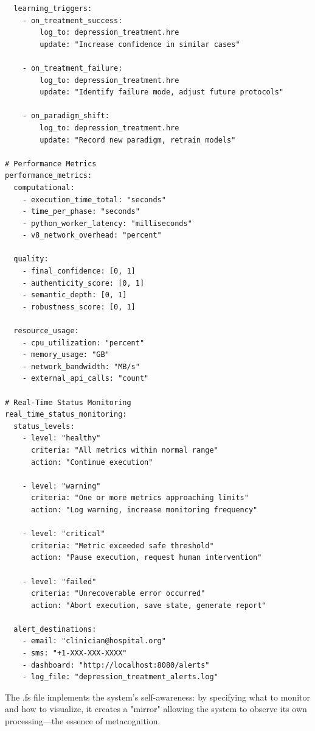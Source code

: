 \begin{verbatim}
  learning_triggers:
    - on_treatment_success:
        log_to: depression_treatment.hre
        update: "Increase confidence in similar cases"
    
    - on_treatment_failure:
        log_to: depression_treatment.hre
        update: "Identify failure mode, adjust future protocols"
    
    - on_paradigm_shift:
        log_to: depression_treatment.hre
        update: "Record new paradigm, retrain models"

# Performance Metrics
performance_metrics:
  computational:
    - execution_time_total: "seconds"
    - time_per_phase: "seconds"
    - python_worker_latency: "milliseconds"
    - v8_network_overhead: "percent"
  
  quality:
    - final_confidence: [0, 1]
    - authenticity_score: [0, 1]
    - semantic_depth: [0, 1]
    - robustness_score: [0, 1]
  
  resource_usage:
    - cpu_utilization: "percent"
    - memory_usage: "GB"
    - network_bandwidth: "MB/s"
    - external_api_calls: "count"

# Real-Time Status Monitoring
real_time_status_monitoring:
  status_levels:
    - level: "healthy"
      criteria: "All metrics within normal range"
      action: "Continue execution"
    
    - level: "warning"
      criteria: "One or more metrics approaching limits"
      action: "Log warning, increase monitoring frequency"
    
    - level: "critical"
      criteria: "Metric exceeded safe threshold"
      action: "Pause execution, request human intervention"
    
    - level: "failed"
      criteria: "Unrecoverable error occurred"
      action: "Abort execution, save state, generate report"
  
  alert_destinations:
    - email: "clinician@hospital.org"
    - sms: "+1-XXX-XXX-XXXX"
    - dashboard: "http://localhost:8080/alerts"
    - log_file: "depression_treatment_alerts.log"
\end{verbatim}

\begin{theorem}
\label{thm:fs_metacognitive_mirror}
The .fs file implements the system's self-awareness: by specifying what to monitor and how to visualize, it creates a "mirror" allowing the system to observe its own processing—the essence of metacognition.
\end{theorem}

